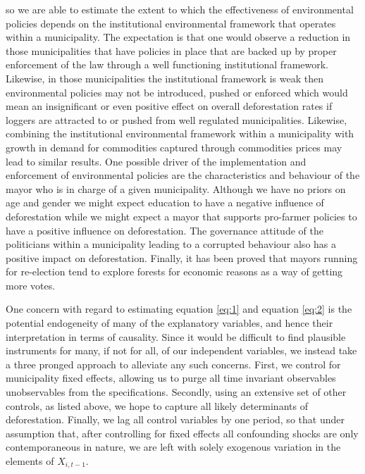 so we are able to estimate the extent to which the effectiveness of environmental policies depends on the institutional environmental framework that operates within a municipality. The expectation is that one would observe a reduction in those municipalities that have policies in place that are backed up by proper enforcement of the law through a well functioning institutional framework.  Likewise, in those municipalities the institutional framework is weak then environmental policies may not be introduced, pushed or enforced which would mean an insignificant or even positive effect on overall deforestation rates if loggers are attracted to or pushed from well regulated municipalities. Likewise, combining the institutional environmental framework within a municipality with growth in demand for commodities captured through commodities prices may lead to similar results. One possible driver of the implementation and enforcement of environmental policies are the characteristics and behaviour of the mayor who is in charge of a given municipality. Although we have no priors on age and gender we might expect education to have a negative influence of deforestation while we might expect a mayor that supports pro-farmer policies to have a positive influence on deforestation. The governance attitude of the politicians  within a municipality leading to a corrupted behaviour also has a positive impact on deforestation. Finally, it has been proved that mayors running for re-election tend to explore forests for economic reasons as a way of getting more votes.

One concern with regard to estimating equation \ref{eq:1} and equation \ref{eq:2} is the potential endogeneity of many of the explanatory variables, and hence their interpretation in terms of causality.  Since it would be difficult to find plausible instruments for many, if not for all, of our independent variables, we instead take a three pronged approach to alleviate any such concerns.  First, we control for municipality fixed effects, allowing us to purge all time invariant observables unobservables from the specifications.  Secondly, using an extensive set of other controls, as listed above, we hope to capture all likely determinants of deforestation.  Finally, we lag all control variables by one period, so that under assumption that, after controlling for fixed effects all confounding shocks are only contemporaneous in nature, we are left with solely exogenous variation in the elements of $X_{i,t-1}$.

